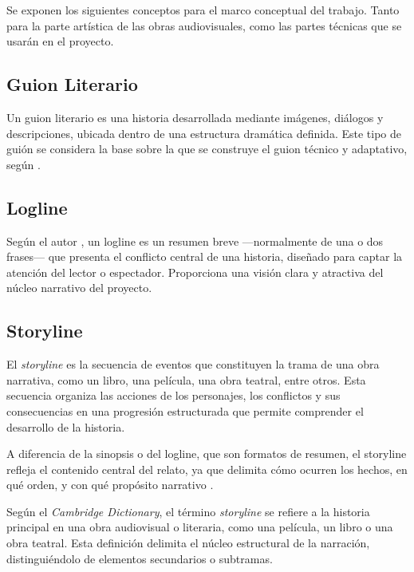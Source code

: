 \documentclass[12pt]{article}
\begin{document}
	\hspace{1.27cm}Se exponen los siguientes conceptos para el marco conceptual del trabajo. Tanto para la parte artística de las obras audiovisuales, como las partes técnicas que se usarán en el proyecto.

	\subsection{Guion Literario}

	\hspace{1.27cm}Un guion literario es una historia desarrollada mediante imágenes, diálogos y descripciones, ubicada dentro de una estructura dramática definida. Este tipo de guión se considera la base sobre la que se construye el guion técnico y adaptativo, según \textcite{field2005}.

	\subsection{Logline}

	\hspace{1.27cm}Según el autor \textcite{snyder2005}, un logline es un resumen breve —normalmente de una o dos frases— que presenta el conflicto central de una historia, diseñado para captar la atención del lector o espectador. Proporciona una visión clara y atractiva del núcleo narrativo del proyecto.

	\subsection{Storyline}

	\hspace{1.27cm}El \textit{storyline} es la secuencia de eventos que constituyen la trama de una obra narrativa, como un libro, una película, una obra teatral, entre otros. Esta secuencia organiza las acciones de los personajes, los conflictos y sus consecuencias en una progresión estructurada que permite comprender el desarrollo de la historia.

	\hspace{1.27cm}A diferencia de la sinopsis o del logline, que son formatos de resumen, el storyline refleja el contenido central del relato, ya que delimita cómo ocurren los hechos, en qué orden, y con qué propósito narrativo \parencite{cambridge_storyline}.

	\hspace{1.27cm}Según el \textit{Cambridge Dictionary}, el término \textit{storyline} se refiere a la historia principal en una obra audiovisual o literaria, como una película, un libro o una obra teatral. Esta definición delimita el núcleo estructural de la narración, distinguiéndolo de elementos secundarios o subtramas.
\end{document}
